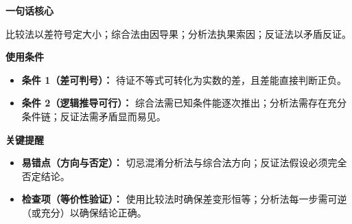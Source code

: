 \begin{summarybox}

	\textbf{\textcolor{CSummary}{一句话核心}}

	比较法以差符号定大小；综合法由因导果；分析法执果索因；反证法以矛盾反证。

	\medskip
	\textbf{\textcolor{CSummary}{使用条件}}
	\begin{itemize}[leftmargin=*, itemsep=0.5em, topsep=0.4em]
		\item \textbf{条件 1（差可判号）：} 待证不等式可转化为实数的差，且差能直接判断正负。
		\item \textbf{条件 2（逻辑推导可行）：} 综合法需已知条件能逐次推出；分析法需存在充分条件链；反证法需矛盾显而易见。
	\end{itemize}

	\medskip
	\textbf{\textcolor{CSummary}{关键提醒}}
	\begin{itemize}[leftmargin=*, itemsep=0.5em, topsep=0.4em]
		\item \textbf{易错点（方向与否定）：} 切忌混淆分析法与综合法方向；反证法假设必须完全否定结论。
		\item \textbf{检查项（等价性验证）：} 使用比较法时确保差变形恒等；分析法每一步需可逆（或充分）以确保结论正确。
	\end{itemize}
\end{summarybox}
